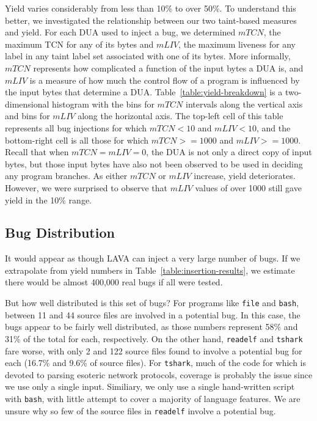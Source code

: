 Yield varies considerably from less than 10\% to over 50\%.
To understand this better, we investigated the relationship between our two taint-based measures and yield.
For each DUA used to inject a bug, we determined $mTCN$, the maximum TCN for any of its bytes and $mLIV$, the maximum liveness for any label in any taint label set associated with one of its bytes.  
More informally, $mTCN$ represents how complicated a function of the input bytes a DUA is, and $mLIV$ is a measure of how much the control flow of a program is influenced by the input bytes that determine a DUA.
Table~\ref{table:yield-breakdown} is a two-dimensional histogram with the bins for $mTCN$ intervals along the vertical axis and bins for $mLIV$ along the horizontal axis.
The top-left cell of this table represents all bug injections for which $mTCN<10$ and $mLIV<10$, and the bottom-right cell is all those for which $mTCN>=1000$ and $mLIV>=1000$.
Recall that when  $mTCN=mLIV=0$, the DUA is not only a direct copy of input bytes, but those input bytes have also not been observed to be used in deciding any program branches. 
As either $mTCN$ or $mLIV$ increase, yield deteriorates.  
However, we were surprised to observe that $mLIV$ values of over 1000 still gave yield in the 10\% range.

\subsection{Bug Distribution}

It would appear as though LAVA can inject a very large number of bugs.  
If we extrapolate from yield numbers in Table~\ref{table:insertion-results}, we estimate there would be almost 400,000 real bugs if all were tested.

\noindent
But how well distributed is this set of bugs? 
For programs like \verb+file+ and \verb+bash+, between 11 and 44 source files  are involved in a potential bug.
In this case, the bugs appear to be fairly well distributed, as those numbers represent 58\% and 31\% of the total for each, respectively.
On the other hand, \verb+readelf+ and \verb+tshark+ fare worse, with only 2 and 122 source files found to involve a potential bug for each (16.7\% and 9.6\% of source files).
For \verb+tshark+, much of the code for which is devoted to parsing esoteric network protocols, coverage is probably the issue since we use only a single input.
Similiary, we only use a single hand-written script with \verb+bash+, with little attempt to cover a majority of language features.
We are unsure why so few of the source files in \verb+readelf+ involve a potential bug.
 

